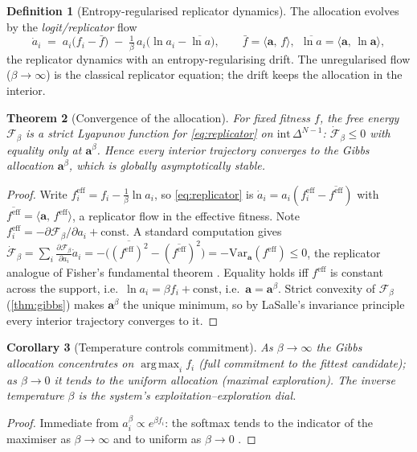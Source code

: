 \documentclass[11pt,a4paper]{article}
\theoremstyle{plain}
\newtheorem{theorem}{Theorem}[section]
\newtheorem{corollary}[theorem]{Corollary}
\theoremstyle{definition}
\newtheorem{definition}[theorem]{Definition}
\theoremstyle{remark}
\DeclareMathOperator*{\argmax}{arg\,max}
\newcommand{\simplex}{\Delta}                 %
\newcommand{\alloc}{\mathbf{a}}               %
\newcommand{\Free}{\mathcal{F}}               %
\newcommand{\inner}[2]{\langle #1,\,#2\rangle}
\begin{document}
\begin{definition}[Entropy-regularised replicator dynamics]
\label{def:replicator}
The allocation evolves by the \emph{logit/replicator} flow
\begin{equation}
\dot a_i\;=\;a_i\big(f_i-\bar f\big)\;-\;\tfrac1\beta\,a_i\big(\ln a_i-
\overline{\ln a}\big),\qquad \bar f=\inner{\alloc}{f},\ \
\overline{\ln a}=\inner{\alloc}{\ln\alloc},
\label{eq:replicator}
\end{equation}
the replicator dynamics \citep{taylor1978,hofbauer1998,maynardsmith1982} with an
entropy-regularising drift. The unregularised flow ($\beta\to\infty$) is the
classical replicator equation; the drift keeps the allocation in the interior.
\end{definition}

\begin{theorem}[Convergence of the allocation]
\label{thm:repconv}
For fixed fitness $f$, the free energy $\Free_\beta$ is a strict Lyapunov
function for \cref{eq:replicator} on $\mathrm{int}\,\simplex^{N-1}$:
$\dot{\Free}_\beta\le0$ with equality only at $\alloc^\beta$. Hence every
interior trajectory converges to the Gibbs allocation $\alloc^\beta$, which is
globally asymptotically stable.
\end{theorem}
\begin{proof}
Write $f^{\mathrm{eff}}_i=f_i-\tfrac1\beta\ln a_i$, so \cref{eq:replicator} is
$\dot a_i=a_i(f^{\mathrm{eff}}_i-\overline{f^{\mathrm{eff}}})$ with
$\overline{f^{\mathrm{eff}}}=\inner{\alloc}{f^{\mathrm{eff}}}$, a replicator
flow in the effective fitness. Note $f^{\mathrm{eff}}_i=-\partial\Free_\beta/
\partial a_i+\text{const}$. A standard computation gives
$\dot{\Free}_\beta=\sum_i\frac{\partial\Free_\beta}{\partial a_i}\dot a_i
=-\big(\overline{(f^{\mathrm{eff}})^2}-(\overline{f^{\mathrm{eff}}})^2\big)
=-\mathrm{Var}_{\alloc}(f^{\mathrm{eff}})\le0$, the replicator analogue of
Fisher's fundamental theorem \citep{hofbauer1998}. Equality holds iff
$f^{\mathrm{eff}}$ is constant across the support, i.e.\ $\ln a_i=\beta f_i
+\text{const}$, i.e.\ $\alloc=\alloc^\beta$. Strict convexity of
$\Free_\beta$ (\cref{thm:gibbs}) makes $\alloc^\beta$ the unique minimum, so by
LaSalle's invariance principle \citep{khalil2002} every interior trajectory
converges to it.
\end{proof}

\begin{corollary}[Temperature controls commitment]
\label{cor:temperature}
As $\beta\to\infty$ the Gibbs allocation concentrates on
$\argmax_i f_i$ (full commitment to the fittest candidate); as $\beta\to0$ it
tends to the uniform allocation (maximal exploration). The inverse temperature
$\beta$ is the system's exploitation--exploration dial.
\end{corollary}
\begin{proof}
Immediate from $a^\beta_i\propto e^{\beta f_i}$: the softmax tends to the
indicator of the maximiser as $\beta\to\infty$ and to uniform as $\beta\to0$
\citep{cover2006}.
\end{proof}
\end{document}

